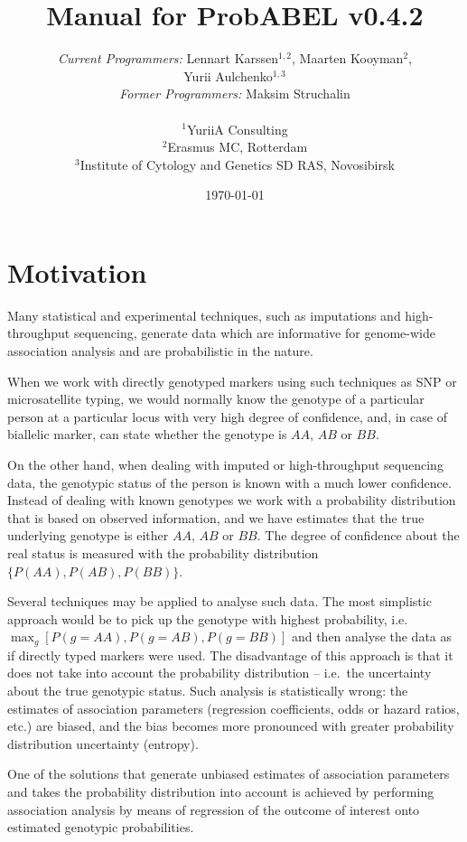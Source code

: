 \documentclass[12pt,a4paper]{article}
\title{Manual for ProbABEL v0.4.2}
\author{\emph{Current Programmers:} Lennart Karssen$^{1,2}$, Maarten
  Kooyman$^2$, \\
  Yurii Aulchenko$^{1,3}$ \\
  \emph{Former Programmers:} Maksim Struchalin
  \\
  \\
  $^{1}${\small YuriiA Consulting} \\
  $^{2}${\small Erasmus MC, Rotterdam}\\
  $^{3}${\small Institute of Cytology and Genetics SD RAS, Novosibirsk}
}
\date{\today}
\begin{document}
\maketitle
\tableofcontents


\section{Motivation}

Many statistical and experimental techniques, such as imputations and
high-throughput sequencing, generate data which are informative for
genome-wide association analysis and are probabilistic in the nature.

When we work with directly genotyped markers using such techniques as
SNP or microsatellite typing, we would normally know the genotype of
a particular person at a particular locus with very high degree of
confidence, and, in case of biallelic marker, can state whether
the genotype is $AA$, $AB$ or $BB$.

On the other hand, when dealing with imputed or high-throughput
sequencing data, the genotypic status of the person is known with a
much lower confidence. Instead of dealing with
known genotypes we work with a probability distribution that is based
on observed information, and we have estimates that the true underlying
genotype is either $AA$, $AB$ or $BB$. The degree of confidence about
the real status is measured with the probability distribution
$\{P(AA), P(AB), P(BB)\}$.

Several techniques may be applied to analyse such data. The most
simplistic approach would be to pick up the genotype with highest
probability, i.e.~$\max_g[P(g=AA), P(g=AB), P(g=BB)]$ and then
analyse the data as if directly typed markers were used. The
disadvantage of this approach is that it does not take into
account the probability distribution -- i.e.~the uncertainty
about the true genotypic status. Such
analysis is statistically wrong: the estimates of association
parameters (regression coefficients, odds or hazard ratios, etc.)
are biased, and the bias becomes more pronounced with greater
probability distribution uncertainty (entropy).

One of the solutions that generate unbiased estimates
of association parameters and takes the
probability distribution into account is achieved by
performing association analysis by means of regression of the
outcome of interest onto estimated genotypic probabilities.
\end{document}
